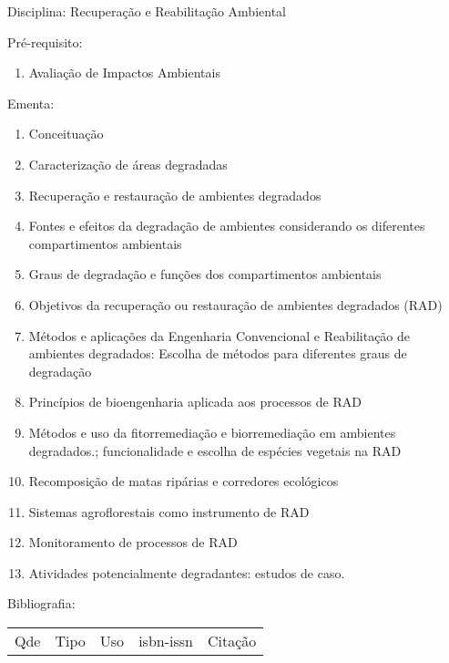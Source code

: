 \documentclass[12pt,a4paper,twoside]{report}
\begin{document}
Disciplina: Recuperação e Reabilitação Ambiental

Pré-requisito:
\begin{enumerate}
\item Avaliação de Impactos Ambientais
\end{enumerate}

Ementa:
\begin{enumerate}
\item Conceituação
\item Caracterização de áreas degradadas
\item Recuperação e restauração de ambientes degradados
\item Fontes e efeitos da degradação de ambientes considerando os diferentes compartimentos ambientais
\item Graus de degradação e funções dos compartimentos ambientais
\item Objetivos da recuperação ou restauração de ambientes degradados (RAD)
\item Métodos e aplicações da Engenharia Convencional e Reabilitação de ambientes degradados: Escolha de métodos para diferentes graus de degradação
\item Princípios de bioengenharia aplicada aos processos de RAD
\item Métodos e uso da fitorremediação e biorremediação em ambientes degradados.; funcionalidade e escolha de espécies vegetais na RAD
\item Recomposição de matas ripárias e corredores ecológicos
\item Sistemas agroflorestais como instrumento de RAD
\item Monitoramento de processos de RAD
\item Atividades potencialmente degradantes: estudos de caso.
\end{enumerate}

Bibliografia:
\begin{tabular}{lllll}
Qde & Tipo & Uso & isbn-issn & Citação \\
\end{tabular}
\end{document}
